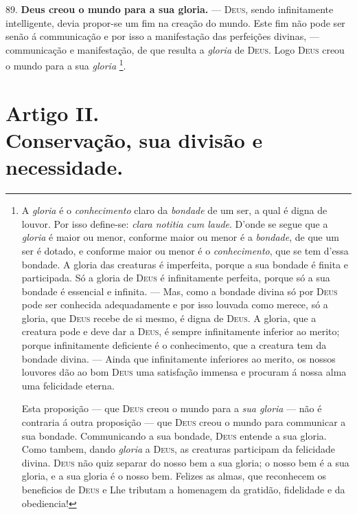  89. \textbf{Deus creou o mundo para a sua gloria.} --- \textsc{Deus}, sendo infinitamente intelligente, devia propor-se um fim na creação do mundo. Este fim não pode ser senão á communicação e por isso a manifestação das perfeições divinas, --- communicação e manifestação, de que resulta a \emph{gloria} de \textsc{Deus}. Logo \textsc{Deus} creou o mundo para a sua \emph{gloria} \footnote{A \emph{gloria} é o \emph{conhecimento} claro da \emph{bondade} de um ser, a qual é digna de louvor. Por isso define-se: \emph{clara notitia cum laude}. D'onde se segue que a \emph{gloria} é maior ou menor, conforme maior ou menor é a \emph{bondade}, de que um ser é dotado, e conforme maior ou menor é o \emph{conhecimento}, que se tem d'essa bondade. A gloria das creaturas é imperfeita, porque a sua bondade é finita e participada. Só a gloria de \textsc{Deus} é infinitamente perfeita, porque só a sua bondade é essencial e infinita. --- Mas, como a bondade divina só por \textsc{Deus} pode ser conhecida adequadamente e por isso louvada como merece, só a gloria, que \textsc{Deus} recebe de si mesmo, é digna de \textsc{Deus}. A gloria, que a creatura pode e deve dar a \textsc{Deus}, é sempre infinitamente inferior ao merito; porque infinitamente deficiente é o conhecimento, que a creatura tem da bondade divina. --- Ainda que infinitamente inferiores ao merito, os nossos louvores dão ao bom \textsc{Deus} uma satisfação immensa e procuram á nossa alma uma felicidade eterna.\par Esta proposição --- que \textsc{Deus} creou o mundo para a \emph{sua gloria} --- não é contraria á outra proposição --- que \textsc{Deus} creou o mundo para communicar a sua bondade. Communicando a sua bondade, \textsc{Deus} entende a sua gloria. Como tambem, dando \emph{gloria} a \textsc{Deus}, as creaturas participam da felicidade divina. \textsc{Deus} não quiz separar do nosso bem a sua gloria; o nosso bem é a sua gloria, e a sua gloria é o nosso bem. Felizes as almas, que reconhecem os beneficios de \textsc{Deus} e Lhe tributam a homenagem da gratidão, fidelidade e da obediencia!}.


\section*{Artigo II.\\ Conservação, sua divisão e necessidade.}

